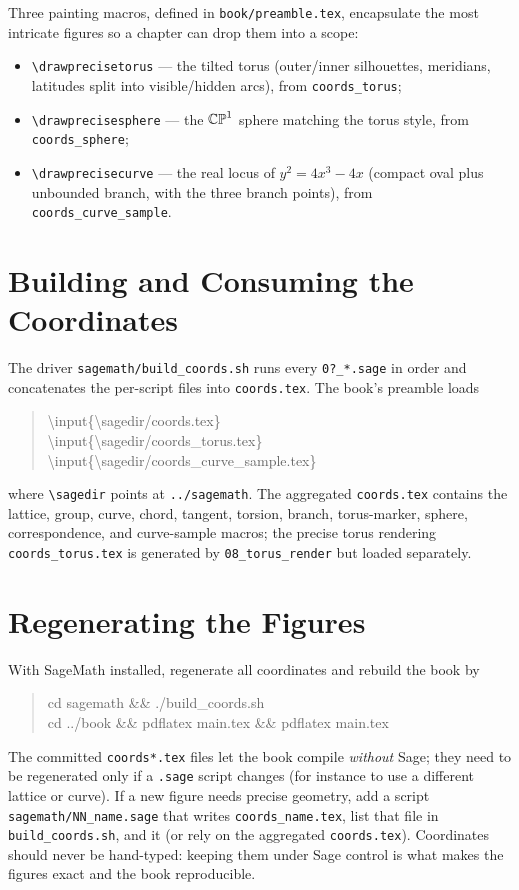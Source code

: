 Three painting macros, defined in \texttt{book/preamble.tex}, encapsulate the most
intricate figures so a chapter can drop them into a scope:
\begin{itemize}
\item \verb|\drawprecisetorus| --- the tilted torus (outer/inner silhouettes,
  meridians, latitudes split into visible/hidden arcs), from \texttt{coords\_torus};
\item \verb|\drawprecisesphere| --- the \(\mathbb{CP}^1\) sphere matching the torus style,
  from \texttt{coords\_sphere};
\item \verb|\drawprecisecurve| --- the real locus of \(y^2 = 4x^3 - 4x\) (compact
  oval plus unbounded branch, with the three branch points), from
  \texttt{coords\_curve\_sample}.
\end{itemize}

\section{Building and Consuming the Coordinates}
\label{sec:C-build}

The driver \texttt{sagemath/build\_coords.sh} runs every \texttt{0?\_*.sage} in
order and concatenates the per-script files into \texttt{coords.tex}. The book's
preamble loads
\begin{quote}\ttfamily
\textbackslash input\{\textbackslash sagedir/coords.tex\}\\
\textbackslash input\{\textbackslash sagedir/coords\_torus.tex\}\\
\textbackslash input\{\textbackslash sagedir/coords\_curve\_sample.tex\}
\end{quote}
where \verb|\sagedir| points at \texttt{../sagemath}. The aggregated
\texttt{coords.tex} contains the lattice, group, curve, chord, tangent, torsion,
branch, torus-marker, sphere, correspondence, and curve-sample macros; the precise
torus rendering \texttt{coords\_torus.tex} is generated by
\texttt{08\_torus\_render} but loaded separately.

\section{Regenerating the Figures}
\label{sec:C-regen}

With SageMath installed, regenerate all coordinates and rebuild the book by
\begin{quote}\ttfamily
cd sagemath \&\& ./build\_coords.sh\\
cd ../book \&\& pdflatex main.tex \&\& pdflatex main.tex
\end{quote}
The committed \texttt{coords*.tex} files let the book compile \emph{without} Sage;
they need to be regenerated only if a \texttt{.sage} script changes (for instance to
use a different lattice or curve). If a new figure needs precise geometry, add a
script \texttt{sagemath/NN\_name.sage} that writes \texttt{coords\_name.tex}, list
that file in \texttt{build\_coords.sh}, and \verb|| it (or rely on the
aggregated \texttt{coords.tex}). Coordinates should never be hand-typed: keeping
them under Sage control is what makes the figures exact and the book reproducible.
